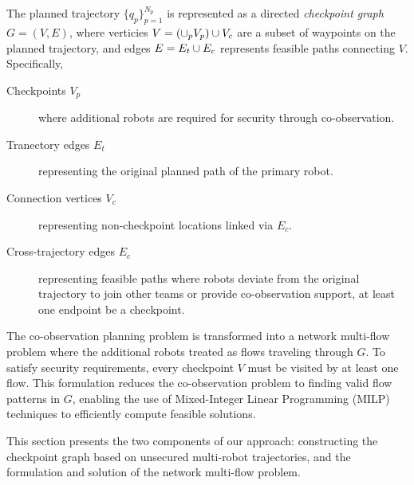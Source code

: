 \documentclass[10pt,twocolumn,twoside]{IEEEtran}
\newcommand{\news}{\color{blue}}
\begin{document}
{\news {} 
The planned trajectory $\{q_p\}_{p=1}^{N_p}$ is represented as a directed \emph{checkpoint graph} $G=(V, E)$, where verticies $V = (\cup_p V_p) \cup V_c$ are a subset of waypoints on the planned trajectory, and edges $E = E_{t} \cup E_{c}$ represents feasible paths connecting $V$. Specifically,
\begin{description}
  \item[Checkpoints $V_p$] where additional robots are required for security through co-observation.
  \item[Tranectory edges $E_t$] representing the original planned path of the primary robot.
  \item[Connection vertices $V_c$] representing non-checkpoint locations linked via $E_c$.
  \item[Cross-trajectory edges $E_c$] representing feasible paths where robots deviate from the original trajectory to join other teams or provide co-observation support, at least one endpoint be a checkpoint. 
\end{description}

The co-observation planning problem is transformed into a network multi-flow problem where the additional robots treated as flows traveling through $G$. To satisfy security requirements, every checkpoint $V$ must be visited by at least one flow. This formulation reduces the co-observation problem to finding valid flow patterns in $G$, enabling the use of Mixed-Integer Linear Programming (MILP) techniques to efficiently compute feasible solutions. 
}

This section presents the two components of our approach: constructing the checkpoint graph based on unsecured multi-robot trajectories, and the formulation and solution of the network multi-flow problem.
\end{document}
